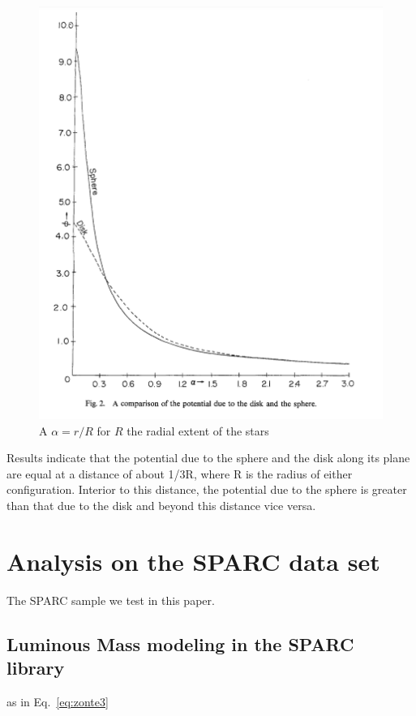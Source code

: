 \documentclass[reprint,%
 amsmath,amssymb,
 aps,
]{revtex4-1}
\begin{document}
 
\begin{figure}
    \centering
    \includegraphics{Chatterjee_SphereDisk.png}
    \caption{A $\alpha = r/R$ for $R$ the radial extent of the stars \cite{Chatterjee}}
    \label{fig:my_geom}
\end{figure}
  Results indicate that the potential due to the sphere and the disk along its plane are equal at a distance of about 1/3R, where R is the radius of either configuration. Interior to this distance, the potential due to the sphere is greater than that due to the disk and beyond this distance vice versa.
  
  
  
\section{Analysis on  the SPARC data set\label{sec:analysis}}
 
The
 SPARC sample we test in this paper.  
 
\subsection{Luminous Mass modeling in the SPARC library}
as in Eq.~\ref{eq:zonte3}
 
\end{document}
